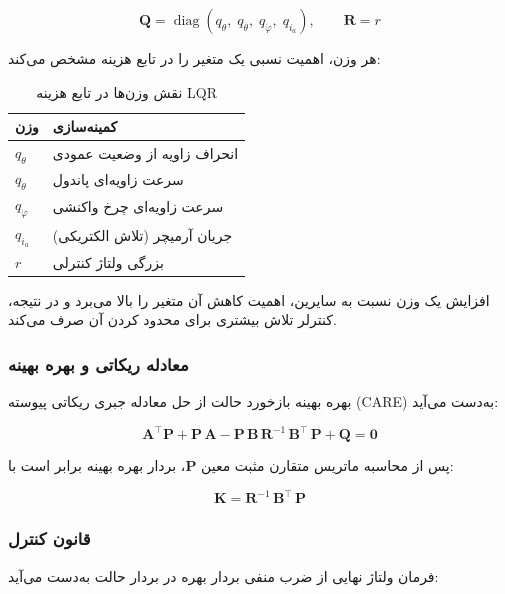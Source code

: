 \begin{equation}
\mathbf{Q} = \operatorname{diag}(q_\theta,\; q_{\dot{\theta}},\; q_{\dot{\varphi}},\; q_{i_a}),
\qquad
\mathbf{R} = r
\end{equation}

هر وزن، اهمیت نسبی یک متغیر را در تابع هزینه مشخص می‌کند:

\begin{table}[H]
\centering
\caption{نقش وزن‌ها در تابع هزینه LQR}
\begin{tabular}{ll}
\toprule
\textbf{وزن} & \textbf{کمینه‌سازی} \\
\midrule
$q_\theta$ & انحراف زاویه از وضعیت عمودی \\
$q_{\dot{\theta}}$ & سرعت زاویه‌ای پاندول \\
$q_{\dot{\varphi}}$ & سرعت زاویه‌ای چرخ واکنشی \\
$q_{i_a}$ & جریان آرمیچر (تلاش الکتریکی) \\
$r$ & بزرگی ولتاژ کنترلی \\
\bottomrule
\end{tabular}
\end{table}

افزایش یک وزن نسبت به سایرین، اهمیت کاهش آن متغیر را بالا می‌برد و در نتیجه، کنترلر تلاش بیشتری برای محدود کردن آن صرف می‌کند.

\subsubsection{معادله ریکاتی و بهره بهینه}

بهره بهینه بازخورد حالت از حل معادله جبری ریکاتی پیوسته (CARE) به‌دست می‌آید:

\begin{equation}
\mathbf{A}^\top \mathbf{P} + \mathbf{P}\,\mathbf{A}
- \mathbf{P}\,\mathbf{B}\,\mathbf{R}^{-1}\,\mathbf{B}^\top\,\mathbf{P}
+ \mathbf{Q} = \mathbf{0}
\end{equation}

پس از محاسبه ماتریس متقارن مثبت معین $\mathbf{P}$، بردار بهره بهینه برابر است با:

\begin{equation}
\mathbf{K} = \mathbf{R}^{-1}\,\mathbf{B}^\top\,\mathbf{P}
\end{equation}

\subsubsection{قانون کنترل}

فرمان ولتاژ نهایی از ضرب منفی بردار بهره در بردار حالت به‌دست می‌آید:

